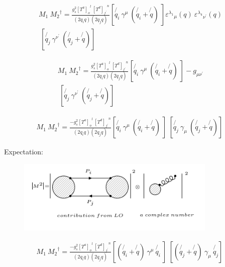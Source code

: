 \begin{equation}
\begin{split}
M_1\: {M_2}^{\dagger} = \frac{g_s^2 {[T^a]_o}^l \:{[T^d]_{f^{\prime}}}^n }{(2q_i q)(2q_j q)} [\not{q_i}\: \gamma^{\mu} \: (\not{q_i} + \not{q})\: ]{\varepsilon^{\lambda_1}}_{\mu} (q) \: {\varepsilon^{\lambda_4}}_{{\nu}^{\prime}} (q) \\
\:[\not{q_j} \:\gamma^{{\nu}^{\prime}} \: (\not{q_j} + \not{q})]\:
\end{split}
\end{equation}

\begin{equation}
\begin{split}
M_1\: {M_2}^{\dagger} = \frac{g_s^2 {[T^a]_o}^l \:{[T^d]_{f^{\prime}}}^n }{(2q_i q)(2q_j q)} [\not{q_i}\: \gamma^{\mu} \: (\not{q_i} + \not{q})\: ] -g_{{\mu}{{\nu}^{\prime}}} \\
\:[\not{q_j} \:\gamma^{{\nu}^{\prime}} \: (\not{q_j} + \not{q})]\:
\end{split}
\end{equation}



\begin{equation}
\begin{split}
M_1\: {M_2}^{\dagger} = \frac{-g_s^2 {[T^a]_o}^l \:{[T^d]_{f^{\prime}}}^n }{(2q_i q)(2q_j q)} [\not{q_i}\: \gamma^{\mu} \: (\not{q_i} + \not{q})\: ]
\:[\not{q_j} \:\gamma_{\mu} \: (\not{q_j} + \not{q})]\:
\end{split}
\end{equation}

Expectation:
\begin{figure}[h!]
\centering
\includegraphics[width=0.85\textwidth]{images/expectationM1M2dagger.png}
\end{figure}


\begin{equation}
\begin{split}
M_1\: {M_2}^{\dagger} = \frac{-g_s^2 {[T^a]_o}^l \:{[T^d]_{f^{\prime}}}^n }{(2q_i q)(2q_j q)} [(\not{q_i} + \not{q})\: \gamma^{\mu} \:  \not{q_i}\:]
\:[(\not{q_j} + \not{q}) \:\gamma_{\mu} \:\not{q_j} ]\:
\end{split}
\end{equation}


